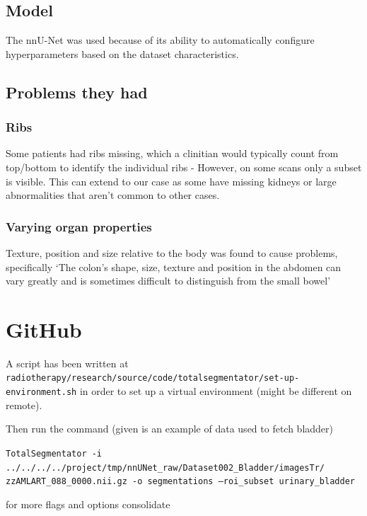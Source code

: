 \documentclass[11pt]{article}
\begin{document}
\subsection{Model}

The nnU-Net was used because of its ability to automatically configure hyperparameters based on the dataset characteristics.

\subsection{Problems they had}

\subsubsection{Ribs}

Some patients had ribs missing, which a clinitian would typically count from top/bottom to identify the individual ribs - However, on some scans only a subset is visible. This can extend to our case as some have missing kidneys or large abnormalities that aren't common to other cases.

\subsubsection{Varying organ properties}

Texture, position and size relative to the body was found to cause problems, specifically `The colon's shape, size, texture and position in the abdomen can vary greatly and is sometimes difficult to distinguish from the small bowel'

\section{GitHub}

A script has been written at \texttt{radiotherapy/research/source/code/totalsegmentator/set-up-environment.sh} in order to set up a virtual environment (might be different on remote). 

Then run the command (given is an example of data used to fetch bladder)

\texttt{TotalSegmentator -i ../../../../project/tmp/nnUNet\_raw/Dataset002\_Bladder/imagesTr/ zzAMLART\_088\_0000.nii.gz -o segmentations --roi\_subset urinary\_bladder}

for more flags and options consolidate \cite{totalsegmentor-git}

\printbibliography
\end{document}
